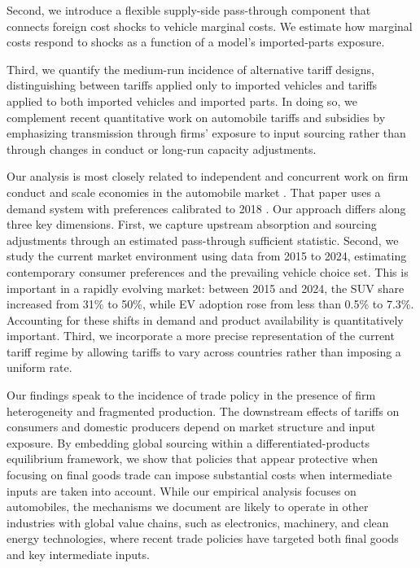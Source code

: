 \documentclass[11pt]{article}
\begin{document}
Second, we introduce a flexible supply-side pass-through component that connects foreign cost shocks to vehicle marginal costs. We estimate how marginal costs respond to shocks as a function of a model’s imported-parts exposure.

Third, we quantify the medium-run incidence of alternative tariff designs, distinguishing between tariffs applied only to imported vehicles and tariffs applied to both imported vehicles and imported parts. In doing so, we complement recent quantitative work on automobile tariffs and subsidies \citep{grieco_evolution_2024, allcott_effects_2024} by emphasizing transmission through firms’ exposure to input sourcing rather than through changes in conduct or long-run capacity adjustments.

Our analysis is most closely related to independent and concurrent work on firm conduct and scale economies in the automobile market \citep{duarte_conduct_2025}. That paper uses a demand system with preferences calibrated to 2018 \citep{grieco_evolution_2024}. Our approach differs along three key dimensions. First, we capture upstream absorption and sourcing adjustments through an estimated pass-through sufficient statistic. Second, we study the current market environment using data from 2015 to 2024, estimating contemporary consumer preferences and the prevailing vehicle choice set. This is important in a rapidly evolving market: between 2015 and 2024, the SUV share increased from 31\% to 50\%, while EV adoption rose from less than 0.5\% to 7.3\%. Accounting for these shifts in demand and product availability is quantitatively important. Third, we incorporate a more precise representation of the current tariff regime by allowing tariffs to vary across countries rather than imposing a uniform rate.

Our findings speak to the incidence of trade policy in the presence of firm heterogeneity and fragmented production. The downstream effects of tariffs on consumers and domestic producers depend on market structure and input exposure. By embedding global sourcing within a differentiated-products equilibrium framework, we show that policies that appear protective when focusing on final goods trade can impose substantial costs when intermediate inputs are taken into account. While our empirical analysis focuses on automobiles, the mechanisms we document are likely to operate in other industries with global value chains, such as electronics, machinery, and clean energy technologies, where recent trade policies have targeted both final goods and key intermediate inputs.
\end{document}

